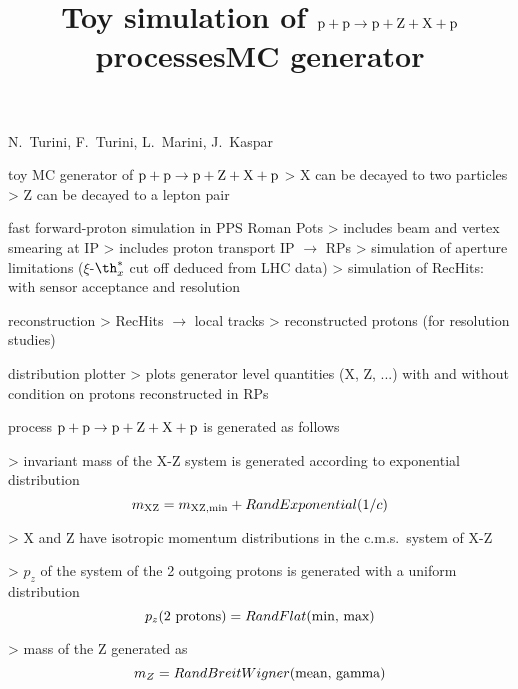 
%

\newpage %

\def\author{PPS}
\def\caption{PPXZ generator}
\def\date{7 Feb 2019}

\newpage %
\hbox{}
\vfil
\title{Toy simulation of $\rm p + p \rightarrow p + Z + X + p$ processes}
\vskip3mm
\centerline{N.~Turini, F.~Turini, L.~Marini, J.~Kaspar}
\vfil


\newpage %

\> toy MC generator of $\rm p + p \rightarrow p + Z + X + p$
\>> X can be decayed to two particles
\>> Z can be decayed to a lepton pair

\> fast forward-proton simulation in PPS Roman Pots
\>> includes beam and vertex smearing at IP
\>> includes proton transport IP $\rightarrow$ RPs
\>> simulation of aperture limitations ($\xi$-$\th^*_x$ cut off deduced from LHC data)
\>> simulation of RecHits: with sensor acceptance and resolution

\> reconstruction
\>> RecHits $\rightarrow$ local tracks
\>> reconstructed protons (for resolution studies)

\> distribution plotter
\>> plots generator level quantities (X, Z, ...) with and without condition on protons reconstructed in RPs



\newpage %
\title{MC generator}

\> process $\rm p + p \rightarrow p + Z + X + p$ is generated as follows

\>> invariant mass of the X-Z system is generated according to exponential distribution
\vskip-3mm
\cThird
$$m_{\rm XZ} = m_{\rm XZ,min} + RandExponential(1/c)$$
\vskip2mm

\>> X and Z have isotropic momentum distributions in the c.m.s.~system of X-Z

\>> $p_z$ of the system of the 2 outgoing protons is generated with a uniform distribution
\cThird
\vskip-2mm
$$p_z(\hbox{2 protons}) = RandFlat(\hbox{min, max})$$
\vskip2mm

\>> mass of the Z generated as
\cThird
\vskip-2mm
$$m_Z = RandBreitWigner(\hbox{mean, gamma})$$
\vskip2mm

